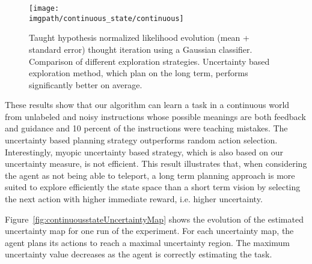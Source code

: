 \begin{figure}[!htbp]
  \centering
  \texttt{[image: \\imgpath/continuous\_state/continuous]}
  \caption{Taught hypothesis normalized likelihood evolution (mean + standard error) thought iteration using a Gaussian classifier. Comparison of different exploration strategies. Uncertainty based exploration method, which plan on the long term, performs significantly better on average.}
  \label{fig:continuousstateRmax}
\end{figure}

These results show that our algorithm can learn a task in a continuous world from unlabeled and noisy instructions whose possible meanings are both feedback and guidance and 10 percent of the instructions were teaching mistakes. The uncertainty based planning strategy outperforms random action selection. Interestingly, myopic uncertainty based strategy, which is also based on our uncertainty measure, is not efficient. This result illustrates that, when considering the agent as not being able to teleport, a long term planning approach is more suited to explore efficiently the state space than a short term vision by selecting the next action with higher immediate reward, i.e. higher uncertainty. 


Figure~\ref{fig:continuousstateUncertaintyMap} shows the evolution of the estimated uncertainty map for one run of the experiment. For each uncertainty map, the agent plans its actions to reach a maximal uncertainty region. The maximum uncertainty value decreases as the agent is correctly estimating the task.

